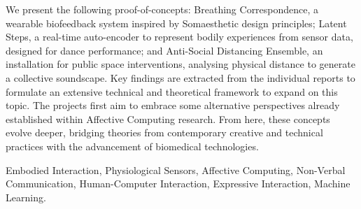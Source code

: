 We present the following proof-of-concepts: Breathing Correspondence, a wearable biofeedback system inspired by Somaesthetic design principles; Latent Steps, a real-time auto-encoder to represent bodily experiences from sensor data, designed for dance performance; and Anti-Social Distancing Ensemble, an installation for public space interventions, analysing physical distance to generate a collective soundscape. Key findings are extracted from the individual reports to formulate an extensive technical and theoretical framework to expand on this topic. The projects first aim to embrace some alternative perspectives already established within Affective Computing research. From here, these concepts evolve deeper, bridging theories from contemporary creative and technical practices with the advancement of biomedical technologies.


\begin{keywords}
Embodied Interaction, Physiological Sensors, Affective Computing, Non-Verbal Communication, Human-Computer Interaction, Expressive Interaction, Machine Learning.
\end{keywords} 